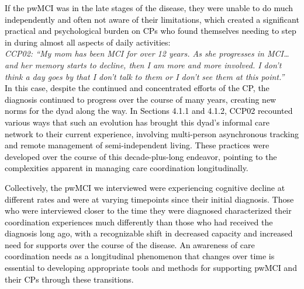 \documentclass[acmsmall]{acmart}
\begin{document}
\textcolor{black}{If the pwMCI was in the late stages of \textcolor{black}{the} disease, they were unable to do much independently and often not aware of their limitations, which created a \textcolor{black}{significant} practical and psychological burden on CPs who found themselves needing to step in \textcolor{black}{during} almost all aspects of daily activities:}
\\

\textit{CCP02: “My mom has been MCI for over 12 years. As she progresses in MCI…and her memory starts to decline, then I am more and more involved. I don't think a day goes by that I don't talk to them or I don't see them at this point.”}
\\

\textcolor{black}{In this case, despite the continued and concentrated efforts of the CP, the diagnosis continued to progress over the course of many years, creating new norms for the dyad along the way. In Sections 4.1.1 and 4.1.2, CCP02 recounted various ways that such an evolution has brought this dyad’s informal care network to their current experience, involving multi-person asynchronous tracking and remote management of semi-independent living. These practices were developed over the course of this decade-plus-long endeavor, pointing to the complexities apparent in managing care coordination longitudinally.}

\textcolor{black}{\textcolor{black}{Collectively, t}he pwMCI we interviewed were experiencing cognitive decline at different rates and were at varying timepoints since their initial diagnosis. Those who were interviewed closer to the time they were diagnosed characterized their coordination experiences much differently than those who had received the diagnosis long ago, with a recognizable shift in decreased capacity and increased need for supports over the course of the disease. An awareness of care coordination needs as a longitudinal phenomenon that changes over time is essential to developing appropriate tools and methods for supporting pwMCI and their CPs through these transitions.}
\\
\end{document}
